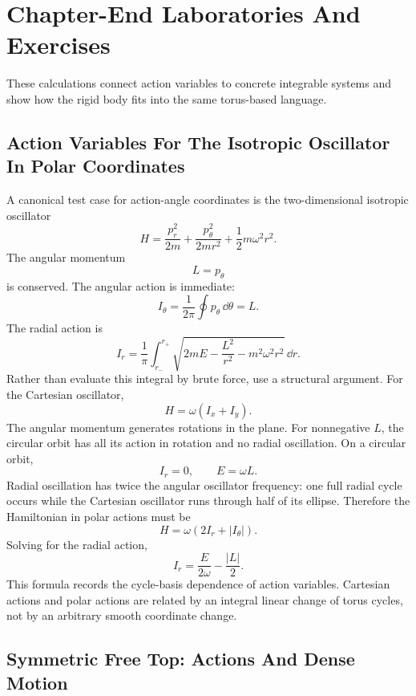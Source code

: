 \section{Chapter-End Laboratories And Exercises}
\label{sec:rigid-integrability-chapter-end-labs}

These calculations connect action variables to concrete integrable systems and
show how the rigid body fits into the same torus-based language.

\subsection[Oscillator Actions In Polar Coordinates]{Action Variables For The
Isotropic Oscillator In Polar Coordinates}
\label{sec:detailed-oscillator-actions}

A canonical test case for action-angle coordinates is the two-dimensional
isotropic oscillator
\[
  H=
  \frac{p_r^2}{2m}
  +
  \frac{p_\theta^2}{2mr^2}
  +
  \frac12m\omega^2r^2.
\]
The angular momentum
\[
  L=p_\theta
\]
is conserved. The angular action is immediate:
\[
  I_\theta=\frac1{2\pi}\oint p_\theta\,\dd\theta=L.
\]
The radial action is
\[
  I_r
  =
  \frac1{\pi}
  \int_{r_-}^{r_+}
  \sqrt{
    2mE-\frac{L^2}{r^2}-m^2\omega^2r^2
  }\,\dd r.
\]
Rather than evaluate this integral by brute force, use a structural argument.
For the Cartesian oscillator,
\[
  H=\omega(I_x+I_y).
\]
The angular momentum generates rotations in the plane. For nonnegative \(L\),
the circular orbit has all its action in rotation and no radial oscillation.
On a circular orbit,
\[
  I_r=0,
  \qquad
  E=\omega L.
\]
Radial oscillation has twice the angular oscillator frequency: one full radial
cycle occurs while the Cartesian oscillator runs through half of its ellipse.
Therefore the Hamiltonian in polar actions must be
\[
  \boxed{
  H=\omega(2I_r+|I_\theta|).
  }
\]
Solving for the radial action,
\[
  \boxed{
  I_r=\frac{E}{2\omega}-\frac{|L|}{2}.
  }
\]
This formula records the cycle-basis dependence of action variables. Cartesian
actions and polar actions are related by an integral linear change of torus
cycles, not by an arbitrary smooth coordinate change.

\subsection{Symmetric Free Top: Actions And Dense Motion}
\label{sec:detailed-symmetric-top-actions}

